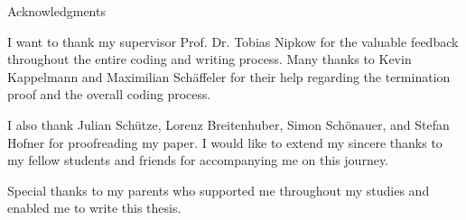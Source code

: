 \thispagestyle{empty}

\vspace*{20mm}

\begin{center}
    { Acknowledgments}
\end{center}

\vspace{10mm}

I want to thank my supervisor Prof. Dr. Tobias Nipkow for the valuable feedback throughout the entire coding and writing process.
Many thanks to Kevin Kappelmann and Maximilian Schäffeler for their help regarding the termination proof and the overall coding process.

I also thank Julian Schütze, Lorenz Breitenhuber, Simon Schönauer, and Stefan Hofner for proofreading my paper.
I would like to extend my sincere thanks to my fellow students and friends for accompanying me on this journey.

Special thanks to my parents who supported me throughout my studies and enabled me to write this thesis.

\cleardoublepage{}
